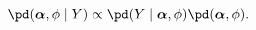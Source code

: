 \begin{equation}
  \pd(\boldsymbol{\alpha}, \phi \mid Y) \propto \pd(Y \mid \boldsymbol{\alpha}, \phi) \pd(\boldsymbol{\alpha}, \phi).
  \label{eqn:joint-post}
\end{equation}